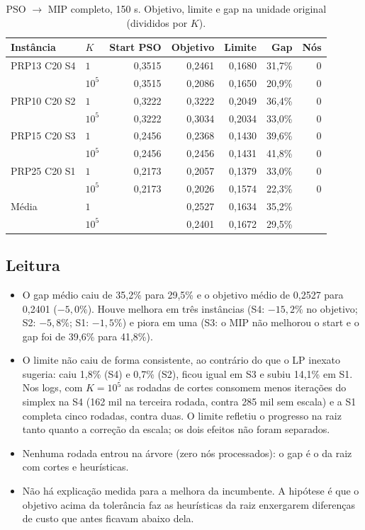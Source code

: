 \documentclass[11pt,a4paper]{article}
\begin{document}
\begin{table}[h]
  \centering
  \begin{tabular}{llrrrrr}
    \toprule
    Instância & $K$ & Start PSO & Objetivo & Limite & Gap & Nós\\
    \midrule
    PRP13 C20 S4 & $1$      & 0{,}3515 & 0{,}2461 & 0{,}1680 & 31{,}7\% & 0\\
                 & $10^{5}$ & 0{,}3515 & 0{,}2086 & 0{,}1650 & 20{,}9\% & 0\\
    PRP10 C20 S2 & $1$      & 0{,}3222 & 0{,}3222 & 0{,}2049 & 36{,}4\% & 0\\
                 & $10^{5}$ & 0{,}3222 & 0{,}3034 & 0{,}2034 & 33{,}0\% & 0\\
    PRP15 C20 S3 & $1$      & 0{,}2456 & 0{,}2368 & 0{,}1430 & 39{,}6\% & 0\\
                 & $10^{5}$ & 0{,}2456 & 0{,}2456 & 0{,}1431 & 41{,}8\% & 0\\
    PRP25 C20 S1 & $1$      & 0{,}2173 & 0{,}2057 & 0{,}1379 & 33{,}0\% & 0\\
                 & $10^{5}$ & 0{,}2173 & 0{,}2026 & 0{,}1574 & 22{,}3\% & 0\\
    \midrule
    Média        & $1$      &          & 0{,}2527 & 0{,}1634 & 35{,}2\% &\\
                 & $10^{5}$ &          & 0{,}2401 & 0{,}1672 & 29{,}5\% &\\
    \bottomrule
  \end{tabular}
  \caption{PSO $\to$ MIP completo, 150 s. Objetivo, limite e gap na unidade
  original (divididos por $K$).}
\end{table}

\subsection{Leitura}

\begin{itemize}[leftmargin=*]
  \item O gap médio caiu de 35{,}2\% para 29{,}5\% e o objetivo médio de 0{,}2527
  para 0{,}2401 ($-5{,}0\%$). Houve melhora em três instâncias (S4: $-15{,}2\%$
  no objetivo; S2: $-5{,}8\%$; S1: $-1{,}5\%$) e piora em uma (S3: o MIP não
  melhorou o start e o gap foi de 39{,}6\% para 41{,}8\%).
  \item O limite não caiu de forma consistente, ao contrário do que o LP
  inexato sugeria: caiu 1{,}8\% (S4) e 0{,}7\% (S2), ficou igual em S3 e
  subiu 14{,}1\% em S1. Nos logs, com $K=10^{5}$ as rodadas de cortes
  consomem menos iterações do simplex na S4 (162 mil na terceira rodada, contra
  285 mil sem escala) e a S1 completa cinco rodadas, contra duas. O limite
  refletiu o progresso na raiz tanto quanto a correção da escala; os dois
  efeitos não foram separados.
  \item Nenhuma rodada entrou na árvore (zero nós processados): o gap é o da
  raiz com cortes e heurísticas.
  \item Não há explicação medida para a melhora da incumbente. A hipótese é que
  o objetivo acima da tolerância faz as heurísticas da raiz enxergarem
  diferenças de custo que antes ficavam abaixo dela.
\end{itemize}
\end{document}
